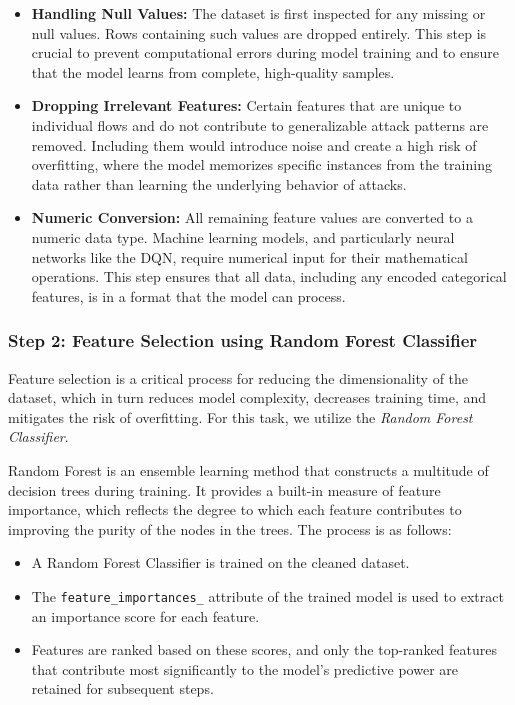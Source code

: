 \documentclass[16pt]{report}
\begin{document}
\begin{itemize}
    \item \textbf{Handling Null Values:} The dataset is first inspected for any missing or null values. Rows containing such values are dropped entirely. This step is crucial to prevent computational errors during model training and to ensure that the model learns from complete, high-quality samples.

    \item \textbf{Dropping Irrelevant Features:} Certain features that are unique to individual flows and do not contribute to generalizable attack patterns are removed. Including them would introduce noise and create a high risk of overfitting, where the model memorizes specific instances from the training data rather than learning the underlying behavior of attacks.

    \item \textbf{Numeric Conversion:} All remaining feature values are converted to a numeric data type. Machine learning models, and particularly neural networks like the DQN, require numerical input for their mathematical operations. This step ensures that all data, including any encoded categorical features, is in a format that the model can process.
\end{itemize}

\subsubsection{Step 2: Feature Selection using Random Forest Classifier}

Feature selection is a critical process for reducing the dimensionality of the dataset, which in turn reduces model complexity, decreases training time, and mitigates the risk of overfitting. For this task, we utilize the \textit{Random Forest Classifier}.

Random Forest is an ensemble learning method that constructs a multitude of decision trees during training. It provides a built-in measure of feature importance, which reflects the degree to which each feature contributes to improving the purity of the nodes in the trees. The process is as follows:

\begin{itemize}
    \item A Random Forest Classifier is trained on the cleaned dataset.
    
    \item The \texttt{feature\_importances\_} attribute of the trained model is used to extract an importance score for each feature.
    
    \item Features are ranked based on these scores, and only the top-ranked features that contribute most significantly to the model’s predictive power are retained for subsequent steps.
\end{itemize}
\end{document}
